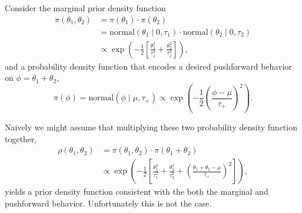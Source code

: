 \documentclass[11pt, oneside]{article}
\begin{document}
Consider the marginal prior density function
%
\begin{align*}
\pi(\theta_{1}, \theta_{2}) 
&=
\pi(\theta_{1}) \cdot \pi(\theta_{2}) 
\\
&=
\text{normal}(\theta_{1} \mid 0, \tau_{1}) \cdot \text{normal}(\theta_{2} \mid 0, \tau_{2}) 
\\
&\propto
\exp \left( - \frac{1}{2} \left[ \frac{ \theta_{1}^{2} }{ \tau_{1}^{2} } + \frac{ \theta_{2}^{2} }{ \tau_{2}^{2} } \right] \right),
\end{align*}
%
and a probability density function that encodes a desired pushforward behavior on $\phi = \theta_{1} + \theta_{2}$,
%
\begin{equation*}
\pi(\phi) 
=
\text{normal}(\phi \mid \mu, \tau_{+})
\propto
\exp \left( - \frac{1}{2} \left( \frac{ \phi - \mu }{\tau_{+} } \right)^{2} \right).
\end{equation*}

Naively we might assume that multiplying these two probability density function together,
%
\begin{align*}
\rho(\theta_{1}, \theta_{2})
&=
\pi(\theta_{1}, \theta_{2}) \cdot \pi(\theta_{1} + \theta_{2}) 
\\
&\propto
\exp \left( - \frac{1}{2} \left[ 
\frac{ \theta_{1}^{2} }{ \tau_{1}^{2} } 
+ \frac{ \theta_{2}^{2} }{ \tau_{2}^{2} } 
+ \left( \frac{ \theta_{1} + \theta_{2} - \mu }{\tau_{+} } \right)^{2}
\right] \right),
\end{align*}
%
yields a prior density function consistent with the both the marginal and pushforward behavior.  Unfortunately this is not the case.
\end{document}
